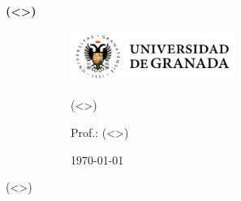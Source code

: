 \documentclass{article}
\begin{document}
\begin{center}
	\LARGE \textbf{(<>)}
\end{center}

	\begin{figure}[h]
		\begin{subfigure}{0.4\linewidth}
		\includegraphics[height=1.7cm]{ugr.png}
		\end{subfigure}
		\begin{subfigure}{0.6\linewidth}

		\small
		\hfill (<>)

		\hfill Prof.: (<>)

		\hfill \today
		\end{subfigure}
	\end{figure}

	\onehalfspace

(<>)

\end{document}
